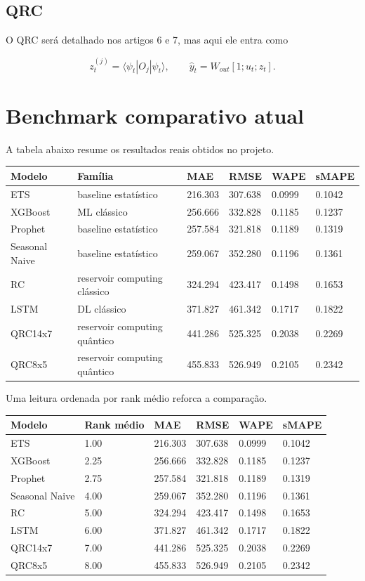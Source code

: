 \documentclass[12pt]{article}
\begin{document}
\subsection{QRC}\label{47-qrc}

O QRC será detalhado nos artigos 6 e 7, mas aqui ele entra como

\[
z_t^{(j)} = \langle \psi_t | O_j | \psi_t \rangle,
\qquad
\hat{y}_t = W_{out} [1; u_t; z_t].
\]

\section{Benchmark comparativo atual}\label{5-benchmark-comparativo-atual}

A tabela abaixo resume os resultados reais obtidos no projeto.

\begin{longtable}[]{@{}llllll@{}}
\toprule\noalign{}
Modelo & Família & MAE & RMSE & WAPE & sMAPE \\
\midrule\noalign{}
\endhead
\bottomrule\noalign{}
\endlastfoot
ETS & baseline estatístico & 216.303 & 307.638 & 0.0999 & 0.1042 \\
XGBoost & ML clássico & 256.666 & 332.828 & 0.1185 & 0.1237 \\
Prophet & baseline estatístico & 257.584 & 321.818 & 0.1189 & 0.1319 \\
Seasonal Naive & baseline estatístico & 259.067 & 352.280 & 0.1196 & 0.1361 \\
RC & reservoir computing clássico & 324.294 & 423.417 & 0.1498 & 0.1653 \\
LSTM & DL clássico & 371.827 & 461.342 & 0.1717 & 0.1822 \\
QRC14x7 & reservoir computing quântico & 441.286 & 525.325 & 0.2038 & 0.2269 \\
QRC8x5 & reservoir computing quântico & 455.833 & 526.949 & 0.2105 & 0.2342 \\
\end{longtable}

Uma leitura ordenada por rank médio reforca a comparação.

\begin{longtable}[]{@{}llllll@{}}
\toprule\noalign{}
Modelo & Rank médio & MAE & RMSE & WAPE & sMAPE \\
\midrule\noalign{}
\endhead
\bottomrule\noalign{}
\endlastfoot
ETS & 1.00 & 216.303 & 307.638 & 0.0999 & 0.1042 \\
XGBoost & 2.25 & 256.666 & 332.828 & 0.1185 & 0.1237 \\
Prophet & 2.75 & 257.584 & 321.818 & 0.1189 & 0.1319 \\
Seasonal Naive & 4.00 & 259.067 & 352.280 & 0.1196 & 0.1361 \\
RC & 5.00 & 324.294 & 423.417 & 0.1498 & 0.1653 \\
LSTM & 6.00 & 371.827 & 461.342 & 0.1717 & 0.1822 \\
QRC14x7 & 7.00 & 441.286 & 525.325 & 0.2038 & 0.2269 \\
QRC8x5 & 8.00 & 455.833 & 526.949 & 0.2105 & 0.2342 \\
\end{longtable}
\end{document}
